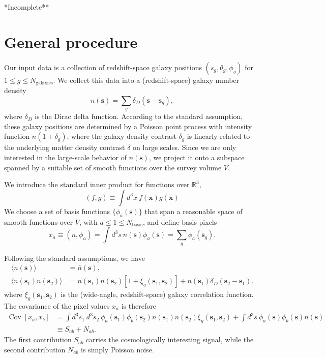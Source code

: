 \documentclass{article}
\renewcommand{\vec}[1]{\bm{#1}}
\newcommand{\nbar}{\bar{n}}
\DeclareMathOperator{\Cov}{Cov}
\begin{document}
{\Huge **Incomplete**}

\section*{General procedure}

Our input data is a collection of redshift-space galaxy positions
$(s_g,\theta_g,\phi_g)$ for $1 \le g \le N_\text{galaxies}$.  We collect this
data into a (redshift-space) galaxy number density
\begin{equation}
    n(\vec{s}) = \sum_g \delta_D(\vec{s} - \vec{s}_g),
\end{equation}
where $\delta_D$ is the Dirac delta function.  According to the standard
assumption, these galaxy positions are determined by a Poisson point process
with intensity function $\nbar (1 + \delta_g)$, where the galaxy density
contrast $\delta_g$ is linearly related to the underlying matter density
contrast $\delta$ on large scales.  Since we are only interested in the
large-scale behavior of $n(\vec{s})$, we project it onto a subspace spanned
by a suitable set of smooth functions over the survey volume $V$.

We introduce the standard inner product for functions over $\mathbb{R}^3$,
\begin{equation}
    (f, g) \equiv \int d^3x~ f(\vec{x}) g(\vec{x})
\end{equation}
We choose a set of basis functions $\{\phi_a(\vec{s})\}$ that span a reasonable
space of smooth functions over $V$, with $a \le 1 \le N_\text{basis}$, and
define basis pixels
\begin{equation}
    x_a \equiv (n, \phi_a)
        = \int d^3s~ n(\vec{s}) \phi_a(\vec{s})
        = \sum_g \phi_a(\vec{s}_g).
\end{equation}

Following the standard assumptions, we have
\begin{align}
    \langle n(\vec{s}) \rangle &= \nbar(\vec{s}), \\
    \langle n(\vec{s}_1) n(\vec{s}_2) \rangle &= \nbar(\vec{s}_1) \nbar(\vec{s}_2) [1 + \xi_g(\vec{s}_1,\vec{s}_2)] + \nbar(\vec{s}_1) \delta_D(\vec{s}_2 - \vec{s}_1).
\end{align}
where $\xi_g(\vec{s}_1,\vec{s}_2)$ is the (wide-angle, redshift-space) galaxy
correlation function.  The covariance of the pixel values $x_a$ is therefore
\begin{align}
    \Cov[x_a,x_b]
        &= \int d^3s_1~ d^3s_2~ \phi_a(\vec{s}_1) \phi_b(\vec{s}_2) \nbar(\vec{s}_1) \nbar(\vec{s}_2) \xi_g(\vec{s}_1,\vec{s}_2) + \int d^3s~ \phi_a(\vec{s}) \phi_b(\vec{s}) \nbar(\vec{s}) \\
        &\equiv S_{ab} + N_{ab}.
\end{align}
The first contribution $S_{ab}$ carries the cosmologically interesting signal,
while the second contribution $N_{ab}$ is simply Poisson noise.
\end{document}
